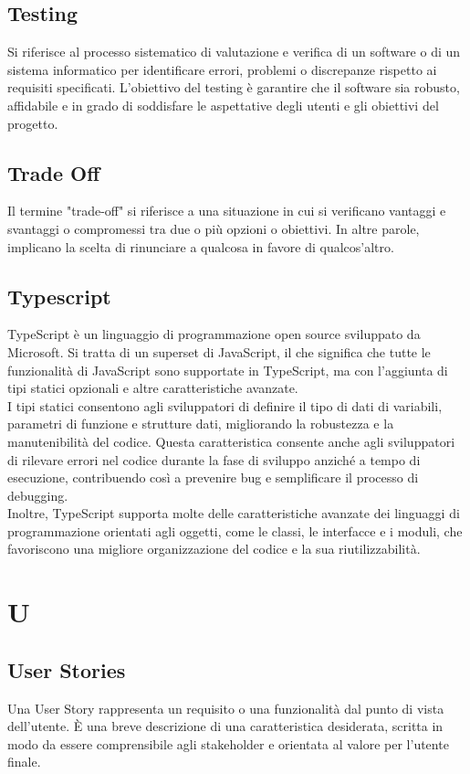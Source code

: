\documentclass{article}
\begin{document}
\subsection{Testing}
Si riferisce al processo sistematico di valutazione e verifica di un software o di un sistema informatico per identificare errori, problemi o discrepanze rispetto ai requisiti specificati. L'obiettivo del testing è garantire che il software sia robusto, affidabile e in grado di soddisfare le aspettative degli utenti e gli obiettivi del progetto.

\subsection{Trade Off}
Il termine "trade-off" si riferisce a una situazione in cui si verificano vantaggi e svantaggi o compromessi tra due o più opzioni o obiettivi. In altre parole, implicano la scelta di rinunciare a qualcosa in favore di qualcos'altro.

\subsection{Typescript}
TypeScript è un linguaggio di programmazione open source sviluppato da Microsoft. Si tratta di un superset di JavaScript, il che significa che tutte le funzionalità di JavaScript sono supportate in TypeScript, ma con l'aggiunta di tipi statici opzionali e altre caratteristiche avanzate.\\
I tipi statici consentono agli sviluppatori di definire il tipo di dati di variabili, parametri di funzione e strutture dati, migliorando la robustezza e la manutenibilità del codice. Questa caratteristica consente anche agli sviluppatori di rilevare errori nel codice durante la fase di sviluppo anziché a tempo di esecuzione, contribuendo così a prevenire bug e semplificare il processo di debugging.\\
Inoltre, TypeScript supporta molte delle caratteristiche avanzate dei linguaggi di programmazione orientati agli oggetti, come le classi, le interfacce e i moduli, che favoriscono una migliore organizzazione del codice e la sua riutilizzabilità.

\section{U}
\subsection{User Stories}
Una User Story rappresenta un requisito o una funzionalità dal punto di vista dell'utente. È una breve descrizione di una caratteristica desiderata, scritta in modo da essere comprensibile agli stakeholder e orientata al valore per l'utente finale.
\end{document}
